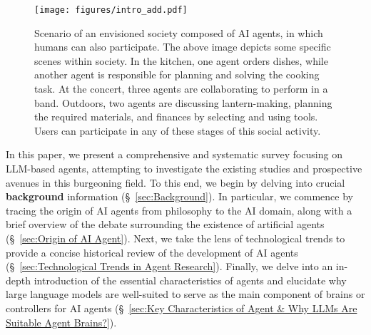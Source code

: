 \documentclass{article}
\begin{document}
\begin{figure}[htbp]
    \centering
    \texttt{[image: figures/intro\_add.pdf]}
    \caption{Scenario of an envisioned society composed of AI agents, in which humans can also participate. The above image depicts some specific scenes within society. In the kitchen, one agent orders dishes, while another agent is responsible for planning and solving the cooking task. At the concert, three agents are collaborating to perform in a band. Outdoors, two agents are discussing lantern-making, planning the required materials, and finances by selecting and using tools. Users can participate in any of these stages of this social activity.}
    \label{fig: genshin_fig}
\end{figure} 

In this paper, we present a comprehensive and systematic survey focusing on LLM-based agents, attempting to investigate the existing studies 
and prospective avenues in this burgeoning field. 
To this end, we begin by delving into crucial \textbf{background} information (\S \ \ref{sec:Background}). 
In particular, we commence by tracing the origin of AI agents from philosophy to the AI domain, along with a brief overview of the debate surrounding the existence of artificial agents (\S \ \ref{sec:Origin of AI Agent}).
Next, we take the lens of technological trends to provide a concise historical review of the development of AI agents (\S \ \ref{sec:Technological Trends in Agent Research}). 
Finally, we delve into an in-depth introduction of the essential characteristics of agents and elucidate why large language models are well-suited to serve as the main component of brains or controllers for AI agents (\S \ \ref{sec:Key Characteristics of Agent & Why LLMs Are Suitable Agent Brains?}).
\end{document}
